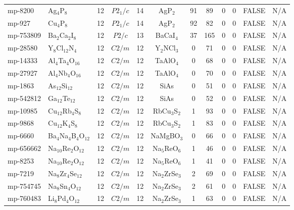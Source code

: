 {\begin{longtable}{llcccccccccc}
    mp-8200 & Ag$_{4}$P$_{8}$ & 12    & $P2_1/c$ & 14    & AgP$_{2}$ & 91    & 89    & 0     & 0     & FALSE & N/A \\
    mp-927 & Cu$_{4}$P$_{8}$ & 12    & $P2_1/c$ & 14    & AgP$_{2}$ & 92    & 82    & 0     & 0     & FALSE & N/A \\
    mp-753809 & Ba$_{2}$Ca$_{2}$I$_{8}$ & 12    & $P2/c$ & 13    & BaCaI$_{4}$ & 37    & 165   & 0     & 0     & FALSE & N/A \\
    mp-28580 & Y$_{8}$Cl$_{12}$N$_{4}$ & 12    & $C2/m$ & 12    & Y$_{2}$NCl$_{3}$ & 0     & 71    & 0     & 0     & FALSE & N/A \\
    mp-14333 & Al$_{4}$Ta$_{4}$O$_{16}$ & 12    & $C2/m$ & 12    & TaAlO$_{4}$ & 0     & 68    & 0     & 0     & FALSE & N/A \\
    mp-27927 & Al$_{4}$Nb$_{4}$O$_{16}$ & 12    & $C2/m$ & 12    & TaAlO$_{4}$ & 0     & 70    & 0     & 0     & FALSE & N/A \\
    mp-1863 & As$_{12}$Si$_{12}$ & 12    & $C2/m$ & 12    & SiAs  & 0     & 51    & 0     & 0     & FALSE & N/A \\
    mp-542812 & Ga$_{12}$Te$_{12}$ & 12    & $C2/m$ & 12    & SiAs  & 0     & 52    & 0     & 0     & FALSE & N/A \\
    mp-10985 & Cu$_{12}$Rb$_{4}$S$_{8}$ & 12    & $C2/m$ & 12    & RbCu$_{3}$S$_{2}$ & 1     & 93    & 0     & 0     & FALSE & N/A \\
    mp-9868 & Cu$_{12}$K$_{4}$S$_{8}$ & 12    & $C2/m$ & 12    & RbCu$_{3}$S$_{2}$ & 1     & 83    & 0     & 0     & FALSE & N/A \\
    mp-6660 & Ba$_{4}$Na$_{4}$B$_{4}$O$_{12}$ & 12    & $C2/m$ & 12    & NaMgBO$_{3}$ & 0     & 66    & 0     & 0     & FALSE & N/A \\
    mp-656662 & Na$_{10}$Re$_{2}$O$_{12}$ & 12    & $C2/m$ & 12    & Na$_{5}$ReO$_{6}$ & 1     & 46    & 0     & 0     & FALSE & N/A \\
    mp-8253 & Na$_{10}$Re$_{2}$O$_{12}$ & 12    & $C2/m$ & 12    & Na$_{5}$ReO$_{6}$ & 1     & 41    & 0     & 0     & FALSE & N/A \\
    mp-7219 & Na$_{8}$Zr$_{4}$Se$_{12}$ & 12    & $C2/m$ & 12    & Na$_{2}$ZrSe$_{3}$ & 2     & 69    & 0     & 0     & FALSE & N/A \\
    mp-754745 & Na$_{8}$Sn$_{4}$O$_{12}$ & 12    & $C2/m$ & 12    & Na$_{2}$ZrSe$_{3}$ & 2     & 61    & 0     & 0     & FALSE & N/A \\
    mp-760483 & Li$_{8}$Pd$_{4}$O$_{12}$ & 12    & $C2/m$ & 12    & Na$_{2}$ZrSe$_{3}$ & 1     & 63    & 0     & 0     & FALSE & N/A \\

\end{longtable}}

